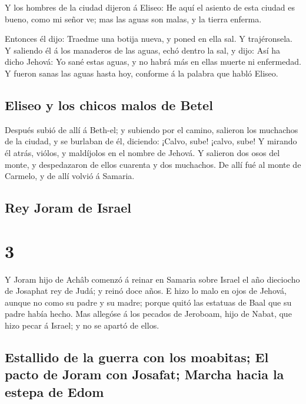  Y los hombres de la ciudad dijeron á Eliseo: He aquí el
asiento de esta ciudad es bueno, como mi señor ve; mas las aguas son
malas, y la tierra enferma.

 Entonces él dijo: Traedme una botija nueva, y poned en
ella sal. Y trajéronsela.  Y saliendo él á los manaderos
de las aguas, echó dentro la sal, y dijo: Así ha dicho Jehová: Yo sané
estas aguas, y no habrá más en ellas muerte ni enfermedad.
 Y fueron sanas las aguas hasta hoy, conforme á la
palabra que habló Eliseo.

\hypertarget{eliseo-y-los-chicos-malos-de-betel}{%
\subsection{Eliseo y los chicos malos de
Betel}\label{eliseo-y-los-chicos-malos-de-betel}}

 Después subió de allí á Beth-el; y subiendo por el
camino, salieron los muchachos de la ciudad, y se burlaban de él,
diciendo: ¡Calvo, sube! ¡calvo, sube!  Y mirando él
atrás, viólos, y maldíjolos en el nombre de Jehová. Y salieron dos osos
del monte, y despedazaron de ellos cuarenta y dos muchachos.
 De allí fué al monte de Carmelo, y de allí volvió á
Samaria.

\hypertarget{rey-joram-de-israel}{%
\subsection{Rey Joram de Israel}\label{rey-joram-de-israel}}

\hypertarget{section-2}{%
\section{3}\label{section-2}}

 Y Joram hijo de Achâb comenzó á reinar en Samaria sobre
Israel el año dieciocho de Josaphat rey de Judá; y reinó doce años.
 E hizo lo malo en ojos de Jehová, aunque no como su padre
y su madre; porque quitó las estatuas de Baal que su padre había hecho.
 Mas allegóse á los pecados de Jeroboam, hijo de Nabat,
que hizo pecar á Israel; y no se apartó de ellos.

\hypertarget{estallido-de-la-guerra-con-los-moabitas-el-pacto-de-joram-con-josafat-marcha-hacia-la-estepa-de-edom}{%
\subsection{Estallido de la guerra con los moabitas; El pacto de Joram
con Josafat; Marcha hacia la estepa de
Edom}\label{estallido-de-la-guerra-con-los-moabitas-el-pacto-de-joram-con-josafat-marcha-hacia-la-estepa-de-edom}}

